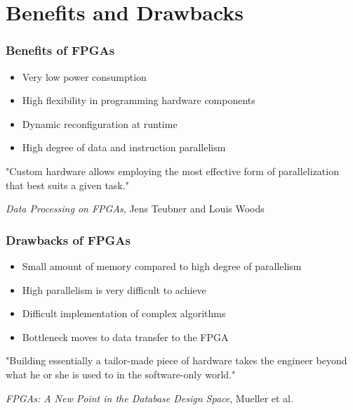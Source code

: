 \documentclass{beamer}
\begin{document}
\section{Benefits and Drawbacks}
\begin{frame}
	\frametitle{Benefits of FPGAs}
	\begin{itemize}
		\item Very low power consumption
		\item High flexibility in programming hardware components
		\item Dynamic reconfiguration at runtime
		\item High degree of data and instruction parallelism
	\end{itemize}
	\vspace*{0.3cm}
	\begin{center}
		"Custom hardware allows employing the most effective form of parallelization that best suits a given task."
	\end{center}
	\vspace*{0.1cm}
	\begin{center}
		\small \emph{Data Processing on FPGAs}, Jens Teubner and Louis Woods 
	\end{center}
\end{frame}

\begin{frame}
\frametitle{Drawbacks of FPGAs}
	\begin{itemize}
		\item Small amount of memory compared to high degree of parallelism
		\item High parallelism is very difficult to achieve
		\item Difficult implementation of complex algorithms
		\item Bottleneck moves to data transfer to the FPGA 
	\end{itemize}
	\begin{center}
		"Building essentially a tailor-made piece of hardware takes the engineer beyond what he or she is used to in the software-only world."
	\end{center}
	\begin{center}
		\small \emph{FPGAs: A New Point in the Database Design Space}, Mueller et al.
	\end{center}
\end{frame}
\end{document}
